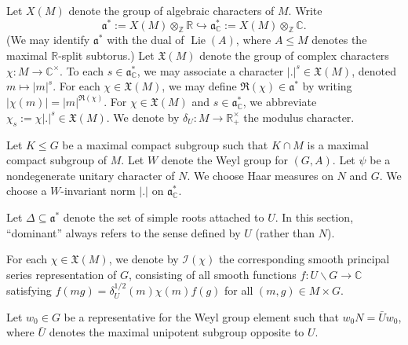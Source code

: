 \documentclass[reqno]{amsart}
\DeclareMathOperator{\Lie}{Lie}
\theoremstyle{plain} \newtheorem{theorem} {Theorem}
\theoremstyle{definition} \newtheorem{definition} [theorem] {Definition}
\theoremstyle{itplain} %
\numberwithin{equation}{section}
\numberwithin{theorem}{section}
\renewcommand{\leq}{\leqslant}
\begin{document}
Let $X(M)$ denote the group of algebraic characters of $M$.  Write
\begin{equation*}
\mathfrak{a}^* := X(M) \otimes_{\mathbb{Z}} \mathbb{R} \hookrightarrow \mathfrak{a}_{\mathbb{C}}^* := X(M) \otimes_{\mathbb{Z}} \mathbb{C}.
\end{equation*}
(We may identify $\mathfrak{a}^*$ with the dual of $\Lie(A)$, where $A \leq M$ denotes the maximal $\mathbb{R}$-split subtorus.)  Let $\mathfrak{X}(M)$ denote the group of complex characters $\chi : M \rightarrow \mathbb{C}^\times$.  To each $s \in \mathfrak{a}_{\mathbb{C}}^*$, we may associate a character $|.|^s \in \mathfrak{X}(M)$, denoted $m \mapsto |m|^{s}$.  For each $\chi \in \mathfrak{X}(M)$, we may define $\Re(\chi) \in \mathfrak{a}^*$ by writing $|\chi(m)| = |m|^{\Re(\chi)}$.  For $\chi \in \mathfrak{X}(M)$ and $s \in \mathfrak{a}^*_{\mathbb{C}}$, we abbreviate $\chi_s := \chi |.|^s \in \mathfrak{X}(M)$.  We denote by $\delta_U : M \rightarrow \mathbb{R}^\times_+$ the modulus character.

Let $K \leq G$ be a maximal compact subgroup such that $K \cap M$ is a maximal compact subgroup of $M$.  Let $W$ denote the Weyl group for $(G,A)$.  Let $\psi$ be a nondegenerate unitary character of $N$.  We choose Haar measures on $N$ and $G$.  We choose a $W$-invariant norm $|.|$ on $\mathfrak{a}_{\mathbb{C}}^*$.

Let $\Delta \subseteq \mathfrak{a}^*$ denote the set of simple roots attached to $U$.  In this section, ``dominant'' always refers to the sense defined by $U$ (rather than $N$).

For each $\chi \in \mathfrak{X}(M)$, we denote by $\mathcal{I}(\chi)$ the corresponding smooth principal series representation of $G$, consisting of all smooth functions $f : U \backslash G \rightarrow \mathbb{C}$ satisfying $f(m g) = \delta_U^{1/2}(m) \chi(m) f(g)$ for all $(m,g) \in M \times G$.

Let $w_0 \in G$ be a representative for the Weyl group element such that $w_0 N = \bar{U} w_0$, where $\bar{U}$ denotes the maximal unipotent subgroup opposite to $U$.
\end{document}
